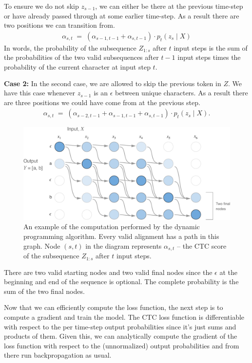 To ensure we do not skip $z_{s-1}$, we can either be there at the previous
time-step or have already passed through at some earlier time-step. As a result
there are two positions we can transition from.
\begin{align*}
\alpha_{s, t} \; = \; (\alpha_{s-1, t-1} + \alpha_{s, t-1}) \cdot p_t(z_{s} \mid X)
\end{align*}
In words, the probability of the subsequence $Z_{1:s}$ after $t$ input steps is
the sum of the probabilities of the two valid subsequences after $t-1$ input
steps times the probability of the current character at input step $t$.

{\bf Case 2:} In the second case, we are allowed to skip the previous token in
$Z$. We have this case whenever $z_{s-1}$ is an $\epsilon$ between unique
characters. As a result there are three positions we could have come from at
the previous step.
\begin{align*}
\alpha_{s, t} \; = \; (\alpha_{s-2, t-1} + \alpha_{s-1, t-1} + \alpha_{s, t-1}) \cdot
    p_t(z_{s} \mid X).
\end{align*}

\begin{figure}
\centering
    \includegraphics[width=\textwidth]{background/figures/ctc_cost.pdf}
\caption{An example of the computation performed by the dynamic programming
    algorithm. Every valid alignment has a path in this graph. Node $(s, t)$ in
    the diagram represents $\alpha_{s, t}$ – the CTC score of the subsequence
    $Z_{1:s}$ after $t$ input steps.}
\end{figure}

There are two valid starting nodes and two valid final nodes since the
$\epsilon$ at the beginning and end of the sequence is optional. The complete
probability is the sum of the two final nodes.

Now that we can efficiently compute the loss function, the next step is to
compute a gradient and train the model. The CTC loss function is differentiable
with respect to the per time-step output probabilities since it's just sums and
products of them. Given this, we can analytically compute the gradient of the
loss function with respect to the (unnormalized) output probabilities and from
there run backpropagation as usual.

